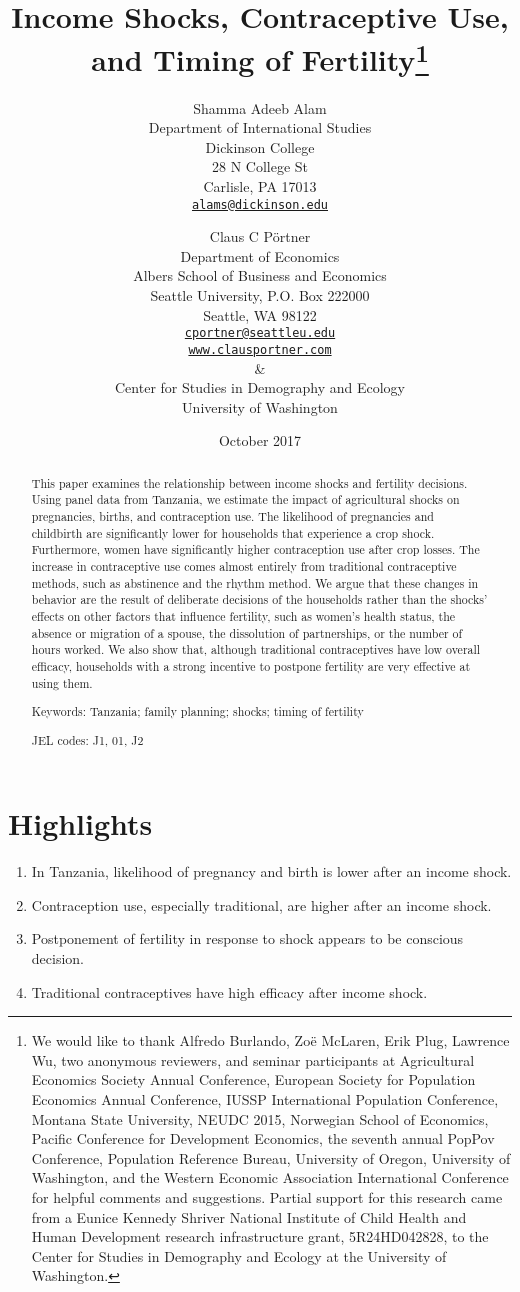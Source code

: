 \documentclass[letterpaper,12pt]{article}
\title{Income Shocks, Contraceptive Use,\\ and Timing of Fertility\thanks{%
We would like to thank 
Alfredo Burlando,
Zo\"e McLaren, 
Erik Plug,
Lawrence Wu, 
two anonymous reviewers, 
and seminar participants at 
Agricultural Economics Society Annual Conference,
European Society for Population Economics Annual Conference,
IUSSP International Population Conference,
Montana State University, 
NEUDC 2015,
Norwegian School of Economics, 
Pacific Conference for Development Economics, 
the seventh annual PopPov Conference, 
Population Reference Bureau,
University of Oregon,
University of Washington,
and the 
Western Economic Association International Conference
for helpful comments and suggestions.
Partial support for this research came from a Eunice Kennedy Shriver National
Institute of Child Health and Human Development research infrastructure grant,
5R24HD042828, to the Center for Studies in Demography and Ecology at the
University of Washington.
}}
\author{Shamma Adeeb Alam\\
	Department of International Studies\\
	Dickinson College\\
	28 N College St\\
	Carlisle, PA 17013\\
	\href{mailto:alams@dickinson.edu}{\texttt{alams@dickinson.edu}}\\
\and
	Claus C P\"ortner\\
    Department of Economics\\
    Albers School of Business and Economics\\
    Seattle University, P.O. Box 222000\\
    Seattle, WA 98122\\
    \href{mailto:cportner@seattleu.edu}{\texttt{cportner@seattleu.edu}}\\
    \href{http://www.clausportner.com}{\texttt{www.clausportner.com}}\\
    \& \\
    Center for Studies in Demography and Ecology \\
    University of Washington\\ 
    }
\date{October 2017}
\begin{document}
\def\sym#1{\ifmmode^{#1}\else\(^{#1}\)\fi}

\setcounter{page}{0}
\maketitle
\thispagestyle{empty}

\newpage
\setcounter{page}{0}
\thispagestyle{empty}

\doublespacing


\begin{abstract} 
\noindent This paper examines the relationship between income 
shocks and fertility decisions. 
Using panel data from Tanzania, we estimate the impact of agricultural shocks 
on 
pregnancies, 
births, 
and 
contraception use.
The likelihood of 
pregnancies and childbirth are significantly lower for households that experience
a crop shock.
Furthermore, women have significantly higher contraception use after 
crop losses. 
The increase in contraceptive use comes almost entirely from traditional 
contraceptive methods, such as abstinence and the rhythm method.
We argue that these changes in behavior are the result of deliberate decisions of
the households rather than the shocks' effects on other factors that influence
fertility, such as women's health status, the absence or migration of a spouse, 
the dissolution of partnerships, or the number of hours worked. 
We also show that, although traditional contraceptives have low overall
efficacy, households with a strong incentive to postpone fertility
are very effective at using them.

\noindent Keywords: Tanzania; family planning; shocks; timing of fertility

\noindent JEL codes: J1, 01, J2
\end{abstract}

\newpage
\setcounter{page}{0}
\thispagestyle{empty}

\section*{Highlights}

\begin{enumerate}
\item In Tanzania, likelihood of pregnancy and birth is lower after an income shock.
\item Contraception use, especially traditional, are higher after an income shock.
\item Postponement of fertility in response to shock appears to be conscious decision.
\item Traditional contraceptives have high efficacy after income shock. 
\end{enumerate}
\end{document}
